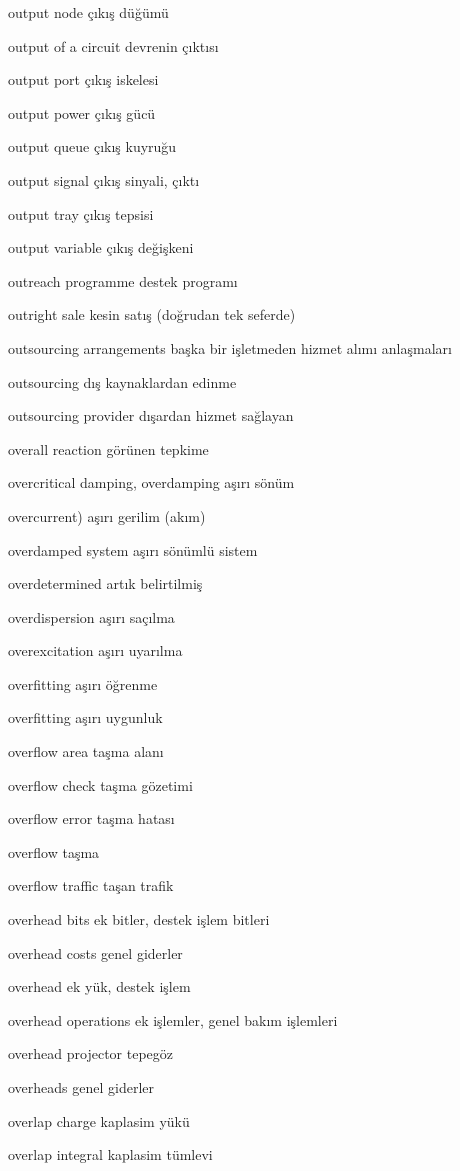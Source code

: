 \documentclass[12pt,fleqn]{article}\usepackage{../../common}
\begin{document}
output node çıkış düğümü

output of a circuit devrenin çıktısı

output port çıkış iskelesi

output power çıkış gücü

output queue çıkış kuyruğu

output signal çıkış sinyali, çıktı

output tray çıkış tepsisi

output variable çıkış değişkeni

outreach programme destek programı

outright sale kesin satış (doğrudan tek seferde)

outsourcing arrangements başka bir işletmeden hizmet alımı anlaşmaları

outsourcing dış kaynaklardan edinme

outsourcing provider dışardan hizmet sağlayan

overall reaction görünen tepkime

overcritical damping, overdamping aşırı sönüm

overcurrent) aşırı gerilim (akım)

overdamped system aşırı sönümlü sistem

overdetermined artık belirtilmiş

overdispersion aşırı saçılma

overexcitation aşırı uyarılma

overfitting aşırı öğrenme

overfitting aşırı uygunluk

overflow area taşma alanı

overflow check taşma gözetimi

overflow error taşma hatası

overflow taşma

overflow traffic taşan trafik

overhead bits ek bitler, destek işlem bitleri

overhead costs genel giderler

overhead ek yük, destek işlem

overhead operations ek işlemler, genel bakım işlemleri

overhead projector tepegöz

overheads genel giderler

overlap charge kaplasim yükü

overlap integral kaplasim tümlevi
\end{document}
